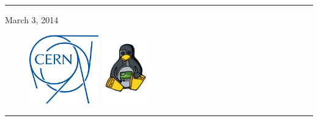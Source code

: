 \begin{titlepage}

\vspace*{3cm}


\noindent \rule{\textwidth}{.1cm}

\hfill March 3, 2014

\vspace*{3cm}

\begin{figure}[h]
  \includegraphics[height=3cm]{fig/cern-logo}
  \hfill
  \includegraphics[height=3cm]{fig/ohwr-logo}
\end{figure}

\vfill


\noindent \rule{\textwidth}{.05cm}

\end{titlepage}
